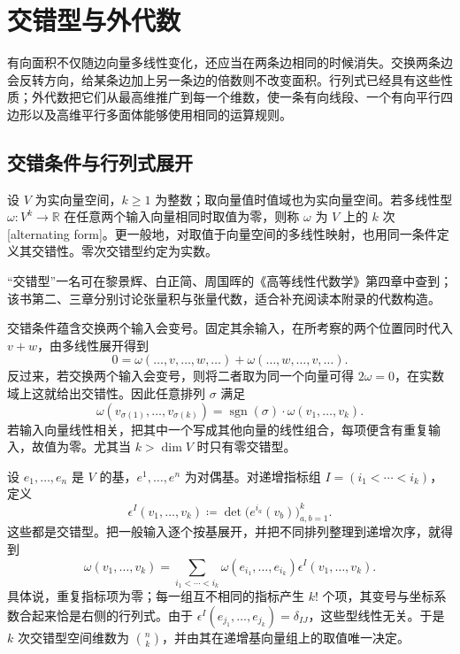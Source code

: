 \section{交错型与外代数}
\label{b1:sec:B102}

有向面积不仅随边向量多线性变化，还应当在两条边相同的时候消失。交换两条边会反转方向，给某条边加上另一条边的倍数则不改变面积。行列式已经具有这些性质；外代数把它们从最高维推广到每一个维数，使一条有向线段、一个有向平行四边形以及高维平行多面体能够使用相同的运算规则。

\subsection{交错条件与行列式展开}
\label{b1:subsec:B10201}

\begin{definition}\label{b1:def:app-b-alternating-form}
设 \(V\) 为实向量空间，\(k\geq1\) 为整数；取向量值时值域也为实向量空间。若多线性型 \(\omega:V^k\rightarrow\mathbb R\) 在任意两个输入向量相同时取值为零，则称 \(\omega\) 为 \(V\) 上的 \(k\) 次[alternating form]。更一般地，对取值于向量空间的多线性映射，也用同一条件定义其交错性。零次交错型约定为实数。
\end{definition}

“交错型”一名可在黎景辉、白正简、周国晖的《高等线性代数学》第四章\cite{LiBaiZhou2014AdvancedLinear}中查到；该书第二、三章分别讨论张量积与张量代数，适合补充阅读本附录的代数构造。

\ProseParagraphBreak

交错条件蕴含交换两个输入会变号。固定其余输入，在所考察的两个位置同时代入 \(v+w\)，由多线性展开得到
\[
 0=\omega(\ldots,v,\ldots,w,\ldots)
   +\omega(\ldots,w,\ldots,v,\ldots).
\]
反过来，若交换两个输入会变号，则将二者取为同一个向量可得 \(2\omega=0\)，在实数域上这就给出交错性。因此任意排列 \(\sigma\) 满足
\[
 \omega(v_{\sigma(1)},\ldots,v_{\sigma(k)})
   =\operatorname{sgn}(\sigma)\cdot\omega(v_1,\ldots,v_k).
\]
若输入向量线性相关，把其中一个写成其他向量的线性组合，每项便含有重复输入，故值为零。尤其当 \(k>\dim V\) 时只有零交错型。

\ProseParagraphBreak

设 \(e_1,\ldots,e_n\) 是 \(V\) 的基，\(e^1,\ldots,e^n\) 为对偶基。对递增指标组 \(I=(i_1<\cdots<i_k)\)，定义
\[
 \epsilon^I(v_1,\ldots,v_k)
   \coloneqq\det\bigl(e^{i_a}(v_b)\bigr)_{a,b=1}^k.
\]
这些都是交错型。把一般输入逐个按基展开，并把不同排列整理到递增次序，就得到
\begin{equation}\label{b1:eq:app-b-alternating-expansion}
 \omega(v_1,\ldots,v_k)
  =\sum_{i_1<\cdots<i_k}
       \omega(e_{i_1},\ldots,e_{i_k})
       \epsilon^I(v_1,\ldots,v_k).
\end{equation}
具体说，重复指标项为零；每一组互不相同的指标产生 \(k!\) 个项，其变号与坐标系数合起来恰是右侧的行列式。由于 \(\epsilon^I(e_{j_1},\ldots,e_{j_k})=\delta_{IJ}\)，这些型线性无关。于是 \(k\) 次交错型空间维数为 \(\binom nk\)，并由其在递增基向量组上的取值唯一决定。

